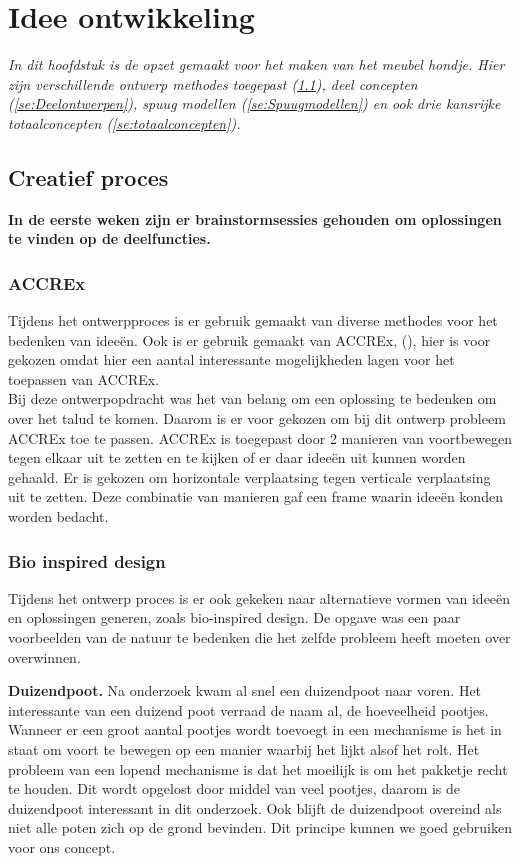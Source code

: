 \chapter{Idee ontwikkeling}
\label{cha:ideeOntwikkeling}
\textit{In dit hoofdstuk is de opzet gemaakt voor het maken van het meubel hondje. Hier zijn verschillende ontwerp methodes toegepast (\cref{se:creatief_proces}), deel concepten (\cref{se:Deelontwerpen}), spuug modellen (\cref{se:Spuugmodellen}) en ook drie kansrijke totaalconcepten (\cref{se:totaalconcepten}).}


\section{Creatief proces}
\label{se:creatief_proces}
{\bf In de eerste weken zijn er brainstormsessies gehouden om oplossingen te vinden op de deelfuncties.}
\subsection{ACCREx}
Tijdens het ontwerpproces is er gebruik gemaakt van diverse methodes voor het bedenken van ideeën. Ook is er gebruik gemaakt van ACCREx, (\cite{coelho_2011}), hier is voor gekozen omdat hier een aantal interessante mogelijkheden lagen voor het toepassen van ACCREx.\\
Bij deze ontwerpopdracht was het van belang om een oplossing te bedenken om over het talud te komen. Daarom is er voor gekozen om bij dit ontwerp probleem ACCREx toe te passen. ACCREx is toegepast door 2 manieren van voortbewegen tegen elkaar uit te zetten en te kijken of er daar ideeën uit kunnen worden gehaald. Er is gekozen om horizontale verplaatsing tegen verticale verplaatsing uit te zetten. Deze combinatie van manieren gaf een frame waarin ideeën konden worden bedacht. \\

\subsection{Bio inspired design}
Tijdens het ontwerp proces is er ook gekeken naar alternatieve vormen van ideeën en oplossingen generen, zoals bio-inspired design. De opgave was een paar voorbeelden van de natuur te bedenken die het zelfde probleem heeft moeten over overwinnen.
\vspace{\baselineskip}

\textbf{Duizendpoot.} Na onderzoek kwam al snel een duizendpoot naar voren. Het interessante van een duizend poot verraad de naam al, de hoeveelheid pootjes. Wanneer er een groot aantal pootjes wordt toevoegt in een mechanisme is het in staat om voort te bewegen op een manier waarbij het lijkt alsof het rolt. Het probleem van een lopend mechanisme is dat het moeilijk is om het pakketje recht te houden. Dit wordt opgelost door middel van veel pootjes, daarom is de duizendpoot interessant in dit onderzoek. Ook blijft de duizendpoot overeind als niet alle poten zich op de grond bevinden. Dit principe kunnen we goed gebruiken voor ons concept.\\

